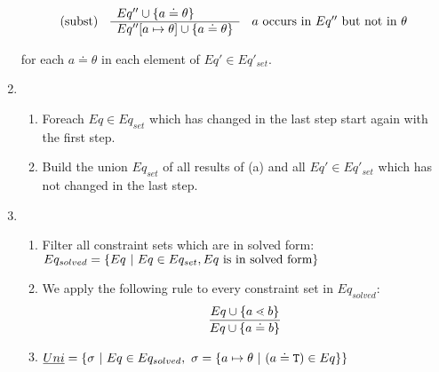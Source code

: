 \begin{enumerate}
      $$\begin{array}[c]{lll}
        (\mathrm{subst}) &
        \begin{array}[c]{l}
          Eq'' \cup \{ a \doteq \theta \}\\
          \hline
          Eq''[a \mapsto \theta] \cup \{ a \doteq \theta \}
        \end{array}
        & a \textrm{ occurs in } Eq'' \textrm{ but not in } \theta 
      \end{array}$$
      
      for each $a \doteq \theta$ in each element of $Eq' \in Eq'_{set}$.

\item 
    \begin{enumerate}
    \item Foreach $Eq \in Eq_{set}$ which has changed in the last step
      start again with the first step.
    \item Build the union $Eq_{set}$ of all results of (a) and all $Eq' \in
      Eq'_{set}$ which has not changed in the last step.
    \end{enumerate}
\item
\begin{enumerate}
\item Filter all constraint sets which are in solved form:\\
$Eq_{solved} = \{  Eq \ | \ Eq \in Eq_{set}, Eq \ \text{is in solved form} \}$
\item We apply the following rule to every constraint set in $Eq_{solved}$:
\begin{align*}
\ddfrac{
  Eq \cup \set{ a \lessdot b } %
}{
  Eq \cup \set{ a \doteq b }
}
\end{align*}
\item $\emph{Uni} = \{ \sigma \ | \ Eq \in Eq_{solved},\ \sigma = \{ a \mapsto \theta \ | \ (a \doteq \texttt{T}) \in Eq \}  \}$
\end{enumerate}
\end{enumerate}

